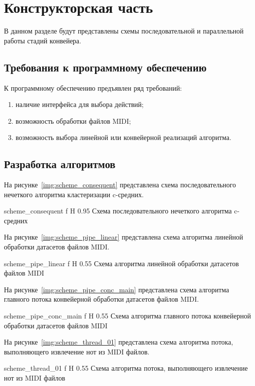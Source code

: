 \chapter{Конструкторская часть}

В данном разделе будут представлены схемы последовательной и параллельной работы стадий конвейера.

\section{Требования к программному обеспечению}

К программному обеспечению предъявлен ряд требований:
\begin{enumerate}
	\item наличие интерфейса для выбора действий;
	\item возможность обработки файлов MIDI;
	\item возможность выбора линейной или конвейерной реализаций алгоритма.
\end{enumerate}

\section{Разработка алгоритмов}

На рисунке~\ref{img:scheme_consequent} представлена схема последовательного нечеткого алгоритма кластеризации c-средних.

	{scheme_consequent}
	{f}
	{H}
	{0.95\textwidth}
	{Схема последовательного нечеткого алгоритма c-средних}
	
На рисунке~\ref{img:scheme_pipe_linear} представлена схема алгоритма линейной обработки датасетов файлов MIDI.

	{scheme_pipe_linear}
	{f}
	{H}
	{0.55\textwidth}
	{Схема алгоритма линейной обработки датасетов файлов MIDI}
	
На рисунке~\ref{img:scheme_pipe_conc_main} представлена схема алгоритма главного потока конвейерной обработки датасетов файлов MIDI.

	{scheme_pipe_conc_main}
	{f}
	{H}
	{0.55\textwidth}
	{Схема алгоритма главного потока конвейерной обработки датасетов файлов MIDI}
	
На рисунке~\ref{img:scheme_thread_01} представлена схема алгоритма потока, выполняющего извлечение нот из MIDI файлов.

	{scheme_thread_01}
	{f}
	{H}
	{0.55\textwidth}
	{Схема алгоритма потока, выполняющего извлечение нот из MIDI файлов}
	

